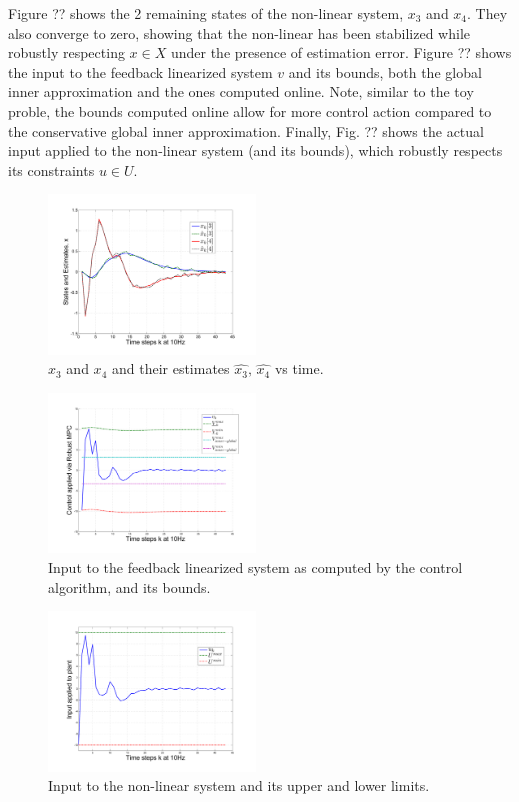 Figure ?? shows the 2 remaining states of the non-linear system, $x_3$ and $x_4$. They also converge to zero, showing that the non-linear has been stabilized while robustly respecting $x\in X$ under the presence of estimation error. Figure ?? shows the input to the feedback linearized system $v$ and its bounds, both the global inner approximation and the ones computed online. Note, similar to the toy proble, the bounds computed online allow for more control action compared to the conservative global inner approximation. Finally, Fig. ?? shows the actual input applied to the non-linear system (and its bounds), which robustly respects its constraints $u \in U$.

\begin{figure}
\includegraphics[width=0.49\textwidth]{figs/x_3n4_manip.pdf}
\caption{$x_3$ and $x_4$ and their estimates $\hat{x_3}, \, \hat{x_4}$ vs time. }
\label{fig:x_34}
\end{figure}

\begin{figure}
\includegraphics[width=0.49\textwidth]{figs/v_and_limits_manip.pdf}
\caption{Input to the feedback linearized system as computed by the control algorithm, and its bounds.}
\label{fig:v_and_limits}
\end{figure}

\begin{figure}
\includegraphics[width=0.49\textwidth]{figs/u_and_limits_manip.pdf}
\caption{Input to the non-linear system and its upper and lower limits.}
\label{fig:u_and_limits}
\end{figure}


